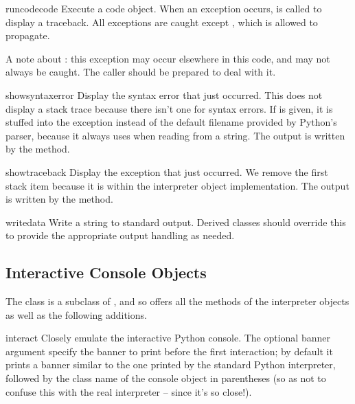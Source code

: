 \begin{methoddesc}{runcode}{code}
Execute a code object.
When an exception occurs,  is called to
display a traceback.  All exceptions are caught except
, which is allowed to propagate.

A note about : this exception may occur
elsewhere in this code, and may not always be caught.  The caller
should be prepared to deal with it.
\end{methoddesc}

\begin{methoddesc}{showsyntaxerror}{}
Display the syntax error that just occurred.  This does not display
a stack trace because there isn't one for syntax errors.
If  is given, it is stuffed into the exception instead
of the default filename provided by Python's parser, because it
always uses  when reading from a string.
The output is written by the  method.
\end{methoddesc}

\begin{methoddesc}{showtraceback}{}
Display the exception that just occurred.  We remove the first stack
item because it is within the interpreter object implementation.
The output is written by the  method.
\end{methoddesc}

\begin{methoddesc}{write}{data}
Write a string to standard output.  Derived classes should override
this to provide the appropriate output handling as needed.
\end{methoddesc}


\subsection{Interactive Console Objects
            \label{console-objects}}

The  class is a subclass of
, and so offers all the methods of the
interpreter objects as well as the following additions.

\begin{methoddesc}{interact}{}
Closely emulate the interactive Python console.
The optional banner argument specify the banner to print before the
first interaction; by default it prints a banner similar to the one
printed by the standard Python interpreter, followed by the class
name of the console object in parentheses (so as not to confuse this
with the real interpreter -- since it's so close!).
\end{methoddesc}

